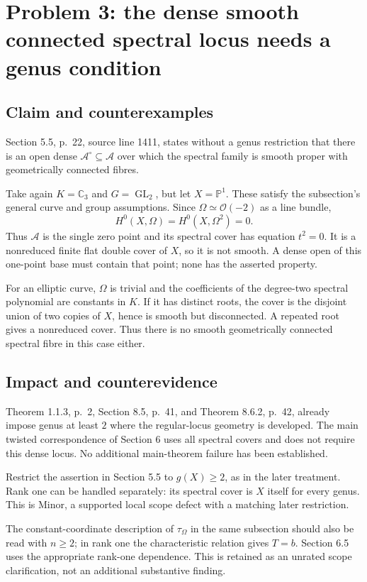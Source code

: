 \documentclass[10pt]{article}
\begin{document}
\section*{Problem 3: the dense smooth connected spectral locus needs a genus condition}
\subsection*{Claim and counterexamples}
Section 5.5, p. 22, source line 1411, states without a genus restriction that there is an open dense \(\mathcal A^\circ\subseteq\mathcal A\) over which the spectral family is smooth proper with geometrically connected fibres.\par
Take again \(K=\mathbb C_3\) and \(G=\operatorname{GL}_2\), but let \(X=\mathbb P^1\). These satisfy the subsection’s general curve and group assumptions. Since \(\Omega\simeq\mathcal O(-2)\) as a line bundle, \[H^0(X,\Omega)=H^0(X,\Omega^2)=0.\] Thus \(\mathcal A\) is the single zero point and its spectral cover has equation \(t^2=0\). It is a nonreduced finite flat double cover of \(X\), so it is not smooth. A dense open of this one-point base must contain that point; none has the asserted property.\par
For an elliptic curve, \(\Omega\) is trivial and the coefficients of the degree-two spectral polynomial are constants in \(K\). If it has distinct roots, the cover is the disjoint union of two copies of \(X\), hence is smooth but disconnected. A repeated root gives a nonreduced cover. Thus there is no smooth geometrically connected spectral fibre in this case either.\par
\subsection*{Impact and counterevidence}
Theorem 1.1.3, p. 2, Section 8.5, p. 41, and Theorem 8.6.2, p. 42, already impose genus at least \(2\) where the regular-locus geometry is developed. The main twisted correspondence of Section 6 uses all spectral covers and does not require this dense locus. No additional main-theorem failure has been established.\par
Restrict the assertion in Section 5.5 to \(g(X)\geq2\), as in the later treatment. Rank one can be handled separately: its spectral cover is \(X\) itself for every genus. This is Minor, a supported local scope defect with a matching later restriction.\par
The constant-coordinate description of \(\tau_\Omega\) in the same subsection should also be read with \(n\geq2\); in rank one the characteristic relation gives \(T=b\). Section 6.5 uses the appropriate rank-one dependence. This is retained as an unrated scope clarification, not an additional substantive finding.\par
\end{document}
